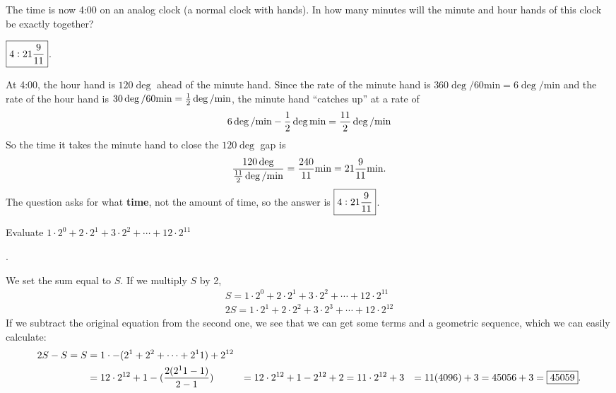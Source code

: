 \documentclass[11pt]{article}
\DeclareRobustCommand{\frac}[3][0pt]{%
  {\begingroup\hspace{#1}#2\hspace{#1}\endgroup\over\hspace{#1}#3\hspace{#1}}}
\begin{document}
\begin{problem}The time is now 4:00 on an analog clock (a normal clock with hands). In how many minutes will the minute and hour hands of this clock be exactly together? %
\end{problem}

\begin{answer}
$\boxed{4:21 \frac{9}{11}}$.
\end{answer}
\begin{solution}
At 4:00, the hour hand is $120 \deg$ ahead of the minute hand. Since the rate of the minute hand is $360 \deg / 60 \text{min} = 6 \deg / \text{min}$ and the rate of the hour hand is $30 \deg / 60 \text{min}= \frac{1}{2} \deg / \text{min}$, the minute hand ``catches up'' at a rate of
$$6 \deg / \text{min}-\frac{1}{2} \deg \text{min} = \frac{11}{2} \deg / \text{min}$$
So the time it takes the minute hand to close the $120 \deg$ gap is
$$\frac{120 \deg}{\frac{11}{2} \deg / \text{min}} = \frac{240}{11} \text{min} = 21 \frac{9}{11} \text{min}.$$
The question asks for what \textbf{time}, not the amount of time, so the answer is $\boxed{4:21 \frac{9}{11}}$.
\end{solution}

\begin{problem}Evaluate $1\cdot2^{0} + 2\cdot2^1 + 3\cdot2^2 +\cdots+12\cdot2^{11}$
\end{problem}

\begin{answer}
.
\end{answer}
\begin{solution}
We set the sum equal to $S$. If we multiply $S$ by 2,
\begin{align*}
S = 1\cdot2^{0} + 2\cdot2^1 + 3\cdot2^2 +\cdots+12\cdot2^{11} \\
2S = 1\cdot2^{1} + 2\cdot2^2 + 3\cdot2^3 +\cdots+12\cdot2^{12}
\end{align*}
If we subtract the original equation from the second one, we see that we can get some terms and a geometric sequence, which we can easily calculate:
\begin{align*}
2S-S=S &=1 \cdot - (2^1+2^2+\cdots+2^11)+2^{12} \\
&= 12\cdot 2^{12}+1 - (\frac{2(2^11-1)}{2-1})
&= 12\cdot 2^{12}+1-2^{12}+2
&= 11 \cdot 2^{12} +3
&= 11(4096) +3 = 45056+3 = \boxed{45059}.
\end{align*}
\end{solution}
\end{document}
